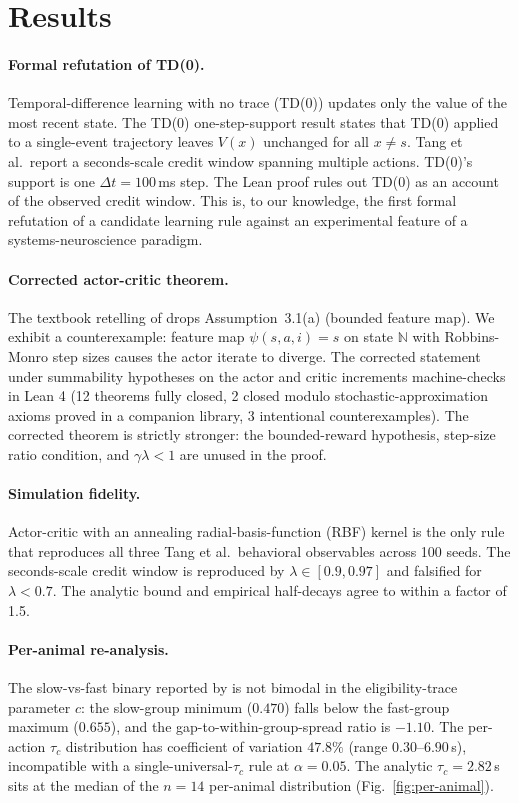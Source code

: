 \section{Results}
\label{sec:results}

\paragraph{Formal refutation of TD(0).}
Temporal-difference learning with no trace (TD(0)) updates only the
value of the most recent state. The TD(0) one-step-support result states that TD(0)
applied to a single-event trajectory leaves $V(x)$ unchanged for
all $x \ne s$. Tang et al.\ report a seconds-scale credit window
spanning multiple actions. TD(0)'s support is one
$\Delta t = 100$\,ms step. The Lean proof rules out TD(0) as an
account of the observed credit window. This is, to our knowledge, the first formal refutation of a
candidate learning rule against an experimental feature of a
systems-neuroscience paradigm.

\paragraph{Corrected actor-critic theorem.}
The textbook retelling of \citet{kondatsitsiklis2000} drops
Assumption~3.1(a) (bounded feature map). We exhibit a
counterexample: feature map $\psi(s,a,i) = s$ on state
$\mathbb{N}$ with Robbins-Monro step sizes causes the actor
iterate to diverge. The corrected statement under summability
hypotheses on the actor and critic increments machine-checks
in Lean 4 (12 theorems fully closed, 2 closed modulo
stochastic-approximation axioms proved in a companion
library, 3 intentional counterexamples). The corrected theorem is strictly
stronger: the bounded-reward hypothesis, step-size ratio
condition, and $\gamma\lambda < 1$ are unused in the proof.


\paragraph{Simulation fidelity.}
Actor-critic with an annealing radial-basis-function (RBF) kernel
is the only rule that reproduces all three Tang et al.\ behavioral
observables
across 100 seeds. The seconds-scale credit window is reproduced
by $\lambda \in [0.9, 0.97]$ and falsified for $\lambda < 0.7$.
The analytic bound and empirical half-decays agree to
within a factor of 1.5.

\paragraph{Per-animal re-analysis.}
The slow-vs-fast binary reported by \citet{tang2024dynamic} is not
bimodal in the eligibility-trace parameter $c$: the slow-group
minimum ($0.470$) falls below the fast-group maximum ($0.655$),
and the gap-to-within-group-spread ratio is $-1.10$. The
per-action $\tau_c$ distribution has coefficient of variation
$47.8\%$ (range $0.30$--$6.90$\,s), incompatible with a
single-universal-$\tau_c$ rule at $\alpha = 0.05$. The analytic
$\tau_c = 2.82$\,s sits at the median of the
$n=14$ per-animal distribution (Fig.~\ref{fig:per-animal}).

